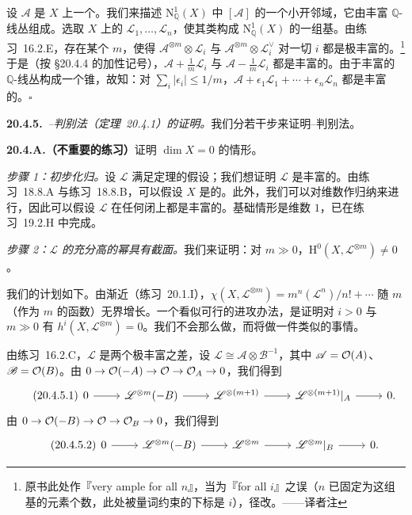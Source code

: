 设 $\mathscr{A}$ 是 $X$ 上一个\trAmple{}\trInvertibleSheaf。我们来描述 $\mathrm{N}^1_{\mathbb{Q}}(X)$ 中 $[\mathscr{A}]$ 的一个小开邻域，它由丰富 $\mathbb{Q}$-线丛组成。选取 $X$ 上的\trInvertibleSheaf{} $\mathscr{L}_1,\dots,\mathscr{L}_n$，使其类构成 $\mathrm{N}^1_{\mathbb{Q}}(X)$ 的一组基。由\mbox{练习~16.2.E}，存在某个 $m$，使得 $\mathscr{A}^{\otimes m}\otimes\mathscr{L}_i$ 与 $\mathscr{A}^{\otimes m}\otimes\mathscr{L}_i^{\vee}$ 对一切 $i$ 都是极丰富的。\footnote{原书此处作『very ample for all $n$』，当为『for all $i$』之误（$n$ 已固定为这组基的元素个数，此处被量词约束的下标是 $i$），径改。——译者注}于是（按 \S20.4.4 的加性记号），$\mathscr{A}+\frac{1}{m}\mathscr{L}_i$ 与 $\mathscr{A}-\frac{1}{m}\mathscr{L}_i$ 都是丰富的。由于丰富的 $\mathbb{Q}$-线丛构成一个锥，故知：对 $\sum_i|\epsilon_i|\le 1/m$，$\mathscr{A}+\epsilon_1\mathscr{L}_1+\cdots+\epsilon_n\mathscr{L}_n$ 都是丰富的。\hfill$\square$

\textbf{20.4.5.}\ \emph{\trNakai--\trMoishezon{}判别法（\mbox{定理~20.4.1}）的证明。}\quad 我们分若干步来证明\trNakai--\trMoishezon{}判别法。

\textbf{20.4.A.（不重要的练习）}\quad 证明 $\dim X=0$ 的情形。

\emph{步骤 1：初步化归。}\quad 设 $\mathscr{L}$ 满足定理的假设；我们想证明 $\mathscr{L}$ 是丰富的。由\mbox{练习~18.8.A} 与\mbox{练习~18.8.B}，可以假设 $X$ 是\trIntegral{}的。此外，我们可以对维数作归纳来进行，因此可以假设 $\mathscr{L}$ 在任何闭\trSubvariety{}上都是丰富的。基础情形是维数 $1$，已在\mbox{练习~19.2.H} 中完成。

\emph{步骤 2：$\mathscr{L}$ 的充分高的幂具有截面。}\quad 我们来证明：对 $m\gg 0$，$\mathrm{H}^0(X,\mathscr{L}^{\otimes m})\ne 0$。

我们的计划如下。由渐近\trRiemannRoch（\mbox{练习~20.1.I}），$\chi(X,\mathscr{L}^{\otimes m})=m^n(\mathscr{L}^n)/n!+\cdots$ 随 $m$（作为 $m$ 的函数）无界增长。一个看似可行的进攻办法，是证明对 $i>0$ 与 $m\gg 0$ 有 $h^i(X,\mathscr{L}^{\otimes m})=0$。我们不会那么做，而将做一件类似的事情。

由\mbox{练习~16.2.C}，$\mathscr{L}$ 是两个极丰富\trLineBundle{}之差，设 $\mathscr{L}\cong\mathscr{A}\otimes\mathscr{B}^{-1}$，其中 $\mathscr{A}=\mathcal{O}(A)$、$\mathscr{B}=\mathcal{O}(B)$。由 $0\to\mathcal{O}(-A)\to\mathcal{O}\to\mathcal{O}_A\to 0$，我们得到
\begin{equation*}\tag{20.4.5.1}\label{eq:nakai-ses-a}
\begin{tikzcd}
0\ar[r] & \mathscr{L}^{\otimes m}(-B)\ar[r] & \mathscr{L}^{\otimes(m+1)}\ar[r] & \mathscr{L}^{\otimes(m+1)}|_A\ar[r] & 0.
\end{tikzcd}
\end{equation*}
由 $0\to\mathcal{O}(-B)\to\mathcal{O}\to\mathcal{O}_B\to 0$，我们得到
\begin{equation*}\tag{20.4.5.2}\label{eq:nakai-ses-b}
\begin{tikzcd}
0\ar[r] & \mathscr{L}^{\otimes m}(-B)\ar[r] & \mathscr{L}^{\otimes m}\ar[r] & \mathscr{L}^{\otimes m}|_B\ar[r] & 0.
\end{tikzcd}
\end{equation*}

